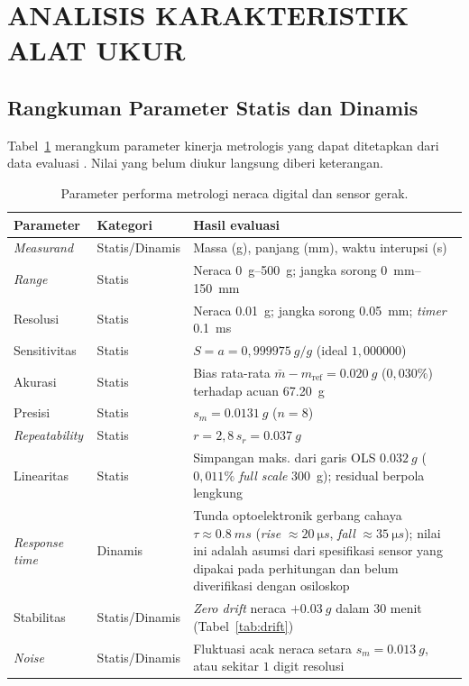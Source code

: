 \documentclass[a4paper, 12pt]{article}
\begin{document}
\section{ANALISIS KARAKTERISTIK ALAT UKUR}
        \subsection{Rangkuman Parameter Statis dan Dinamis}
        Tabel~\ref{tab:param} merangkum parameter kinerja metrologis yang dapat ditetapkan dari data evaluasi \parencite{JCGM2012VIM,MorrisLangari}. Nilai yang belum diukur langsung diberi keterangan.
\begin{table}[H]
\centering
\singlespacing
\caption{Parameter performa metrologi neraca digital dan sensor gerak.}
\label{tab:param}
\small
\begin{tabularx}{\textwidth}{@{}l l X@{}}
\toprule
\textbf{Parameter} & \textbf{Kategori} & \textbf{Hasil evaluasi}\\
\midrule
\textit{Measurand} & Statis/Dinamis & Massa (g), panjang (mm), waktu interupsi (s)\\
\textit{Range} & Statis & Neraca \SIrange{0}{500}{g}; jangka sorong \SIrange{0}{150}{mm}\\
Resolusi & Statis & Neraca \SI{0,01}{g}; jangka sorong \SI{0,05}{mm}; \textit{timer} \SI{0,1}{ms}\\
Sensitivitas & Statis & $S=a=0{,}999975\ \si{g/g}$ (ideal $1{,}000000$)\\
Akurasi & Statis & Bias rata-rata $\bar{m}-m_{\mathrm{ref}}=\SI{0,020}{g}$ ($0{,}030\%$) terhadap acuan \SI{67,20}{g}\\
Presisi & Statis & $s_m=\SI{0,0131}{g}$ ($n=8$)\\
\textit{Repeatability} & Statis & $r=2{,}8\,s_r=\SI{0,037}{g}$\\
Linearitas & Statis & Simpangan maks. dari garis OLS $\SI{0,032}{g}$ ($0{,}011\%$ \textit{full scale} \SI{300}{g}); residual berpola lengkung\\
\textit{Response time} & Dinamis & Tunda optoelektronik gerbang cahaya $\tau\approx\SI{0,8}{ms}$ (\textit{rise} $\approx\SI{20}{\micro s}$, \textit{fall} $\approx\SI{35}{\micro s}$); nilai ini adalah asumsi dari spesifikasi sensor yang dipakai pada perhitungan dan belum diverifikasi dengan osiloskop\\
Stabilitas & Statis/Dinamis & \textit{Zero drift} neraca $+\SI{0,03}{g}$ dalam $30$ menit (Tabel~\ref{tab:drift})\\
\textit{Noise} & Statis/Dinamis & Fluktuasi acak neraca setara $s_m=\SI{0,013}{g}$, atau sekitar $1$ digit resolusi\\
\bottomrule
\end{tabularx}
\end{table}
\end{document}
